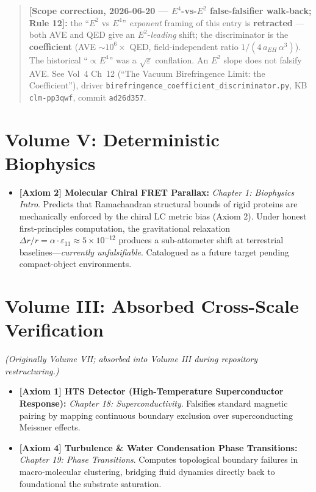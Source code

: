 \begin{itemize}
    \begin{quote}\footnotesize\textbf{[Scope correction, 2026-06-20 --- $E^4$-vs-$E^2$ false-falsifier walk-back; Rule 12]:} the ``$E^2$ vs $E^4$'' \emph{exponent} framing of this entry is \textbf{retracted} --- both AVE and QED give an $E^2$-\emph{leading} shift; the discriminator is the \textbf{coefficient} (AVE $\sim 10^6\times$ QED, field-independent ratio $1/(4\,a_{EH}\,\alpha^3)$). The historical ``$\propto E^4$'' was a $\sqrt{\varepsilon}$ conflation. An $E^2$ slope does not falsify AVE. See Vol~4 Ch~12 (``The Vacuum Birefringence Limit: the Coefficient''), driver \texttt{birefringence\_coefficient\_discriminator.py}, KB \texttt{clm-pp3qwf}, commit \texttt{ad26d357}.\end{quote}
\end{itemize}

\section{Volume V: Deterministic Biophysics}
\begin{itemize}
    \item \textbf{[Axiom 2] Molecular Chiral FRET Parallax:} \textit{Chapter 1: Biophysics Intro}. Predicts that Ramachandran structural bounds of rigid proteins are mechanically enforced by the chiral LC metric bias (Axiom 2). Under honest first-principles computation, the gravitational relaxation $\Delta r / r = \alpha \cdot \varepsilon_{11} \approx 5 \times 10^{-12}$ produces a sub-attometer shift at terrestrial baselines---\textit{currently unfalsifiable}. Catalogued as a future target pending compact-object environments.
\end{itemize}

\section{Volume III: Absorbed Cross-Scale Verification}
\textit{(Originally Volume VII; absorbed into Volume III during repository restructuring.)}
\begin{itemize}
    \item \textbf{[Axiom 1] HTS Detector (High-Temperature Superconductor Response):} \textit{Chapter 18: Superconductivity}. Falsifies standard magnetic pairing by mapping continuous boundary exclusion over superconducting Meissner effects.
    \item \textbf{[Axiom 4] Turbulence \& Water Condensation Phase Transitions:} \textit{Chapter 19: Phase Transitions}. Computes topological boundary failures in macro-molecular clustering, bridging fluid dynamics directly back to foundational the substrate saturation.
\end{itemize}
